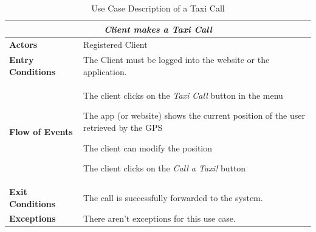 \documentclass[a4paper]{article}
\begin{document}
\begin{enumerate}[label=\bfseries G\arabic*:]
\begin{table} [H]
\begin{center}
\begin{tabular}{ |m{}|m{}|  }
\hline
    \multicolumn{2}{|c|}{\textbf{\textit{Client makes a Taxi Call}}} \\
\hline \hline
    \textbf{Actors}
&   Registered Client
\\ \hline
    \textbf{Entry Conditions}
&   The Client must be logged into the website or the application.
\\ \hline
    \textbf{Flow of Events}
& 
    \begin{enumerate*}
    \item The client clicks on the \emph{Taxi Call} button in the menu
    \item The app (or website) shows the current position of the user retrieved by the GPS
    \item The client can modify the position
    \item The client clicks on the \emph{Call a Taxi!} button
    \end{enumerate*}
\\ \hline
    \textbf{Exit Conditions}
&   The call is successfully forwarded to the system.
\\ \hline
    \textbf{Exceptions}
&   
    There aren't exceptions for this use case.
\\ \hline
\end{tabular}
\end{center}
\caption{Use Case Description of a Taxi Call}
\label{table:clientcall}
\end{table}


\end{enumerate}
\end{document}
